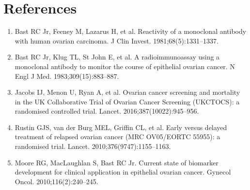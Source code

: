 \section*{References}
\begin{enumerate}
  \item Bast RC Jr, Feeney M, Lazarus H, et al. Reactivity of a monoclonal antibody with human ovarian carcinoma. J Clin Invest. 1981;68(5):1331--1337.
  \item Bast RC Jr, Klug TL, St John E, et al. A radioimmunoassay using a monoclonal antibody to monitor the course of epithelial ovarian cancer. N Engl J Med. 1983;309(15):883--887.
  \item Jacobs IJ, Menon U, Ryan A, et al. Ovarian cancer screening and mortality in the UK Collaborative Trial of Ovarian Cancer Screening (UKCTOCS): a randomised controlled trial. Lancet. 2016;387(10022):945--956.
  \item Rustin GJS, van der Burg MEL, Griffin CL, et al. Early versus delayed treatment of relapsed ovarian cancer (MRC OV05/EORTC 55955): a randomised trial. Lancet. 2010;376(9747):1155--1163.
  \item Moore RG, MacLaughlan S, Bast RC Jr. Current state of biomarker development for clinical application in epithelial ovarian cancer. Gynecol Oncol. 2010;116(2):240--245.
\end{enumerate}

\clearpage
